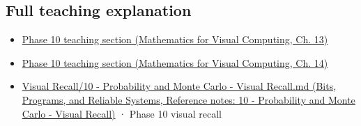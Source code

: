 \subsection{Full teaching explanation}\label{appendix-6a7869dd79a6-full-teaching-explanation}

\begin{itemize}
\tightlist
\item
  \href{../02-Mathematics-for-Visual-Computing/main.pdf\#nameddest=02-foundations-ii-ch029-a-computer-produces-deterministic-pseudorandom-sequences}{Phase 10 teaching section (Mathematics for Visual Computing, Ch. 13)}
\item
  \href{../02-Mathematics-for-Visual-Computing/main.pdf\#nameddest=02-foundations-ii-ch030-monte-carlo-estimates-trade-computation-for-uncertainty}{Phase 10 teaching section (Mathematics for Visual Computing, Ch. 14)}
\item
  \href{../01-Bits-Programs-and-Reliable-Systems/main.pdf\#nameddest=appendix-cb5af353ef77}{Visual Recall/10 - Probability and Monte Carlo - Visual Recall.md (Bits, Programs, and Reliable Systems, Reference notes: 10 - Probability and Monte Carlo - Visual Recall)} · Phase 10 visual recall
\end{itemize}
